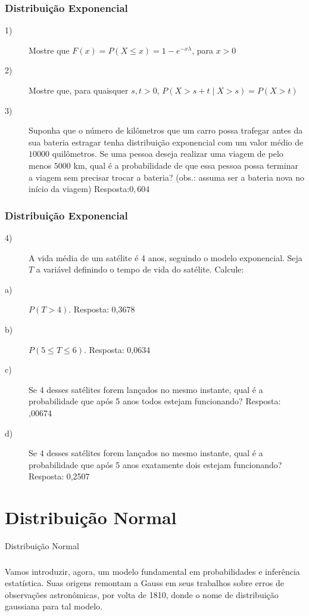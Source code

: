 \documentclass[14pt,aspectratio=1610]{beamer}
\begin{document}
\begin{frame}{}
\frametitle{Distribuição Exponencial}
\begin{block}{}
\justifying
\begin{description}
    \item[1)] Mostre que \( F(x) = P(X \leq x) = 1 - e^{-x\lambda} \), para \( x > 0 \)

    \item[2)] Mostre que, para quaisquer \( s, t > 0 \), \( P(X > s + t \mid X > s) = P(X > t) \)
    \item[3)] Suponha que o número de kilômetros que um carro possa trafegar antes da sua bateria estragar tenha distribuição exponencial com um valor médio de $10000$ quilômetros. Se uma
pessoa deseja realizar uma viagem de pelo menos $5000$ km, qual é a probabilidade de que essa pessoa possa terminar a viagem sem precisar trocar a bateria? (obs.: assuma ser a bateria nova no início da viagem)
\pause
Resposta:$0,604$
\end{description}
\end{block}
\end{frame}

\begin{frame}{}
\frametitle{Distribuição Exponencial}
\begin{block}{}
\justifying
\begin{description}
    \item[4)] A vida média de um satélite é 4 anos, seguindo o modelo exponencial. Seja \( T \) a variável
definindo o tempo de vida do satélite. Calcule:

    \item[a)] \( P(T > 4) \). \pause Resposta: 0,3678

    \item[b)] \( P(5 \leq T \leq 6) \). \pause Resposta: 0,0634

    \item[c)] Se 4 desses satélites forem lançados no mesmo instante, qual é a probabilidade que após 5 anos todos estejam funcionando? Resposta: ,00674

    \item[d)] Se 4 desses satélites forem lançados no mesmo instante, qual é a probabilidade que após 5 anos exatamente dois estejam funcionando? \pause Resposta: 0,2507
\end{description}
\end{block}
\end{frame}

\section{Distribuição Normal}
\begin{frame}{Distribuição Normal}
\frametitle{}
\begin{block}{}
\justifying
Vamos introduzir, agora, um modelo fundamental em probabilidades e inferência estatística. Suas origens remontam a Gauss em seus trabalhos sobre erros de observações astronômicas, por volta de 1810, donde o nome de distribuição gaussiana para tal modelo.
\end{block}
\end{frame}
\end{document}
